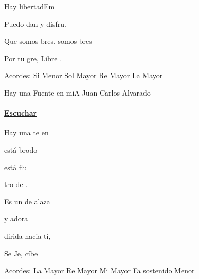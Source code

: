 \documentclass[12pt, spanish]{book}
\begin{document}
\begin{song}{Hay libertad}{Em}
\begin{SBExtraKeys}
{\begin{SBChorus}
                Puedo dan y disfru.
            \end{SBChorus}

            \begin{SBChorus}
                Que somos bres, somos bres

                Por tu gre, Libre .
            \end{SBChorus}


            \ifChordBk
            \begin{SBOpGroup}
                Acordes:\break
                \upchord{\Bm}\qquad Si Menor \hfill
                \upchord{\G}\qquad Sol Mayor \hfill\null\break
                \upchord{\D}\qquad Re Mayor \hfill
                \upchord{\A}\qquad La Mayor \hfill\null\break
            \end{SBOpGroup}
            \fi
        }\end{SBExtraKeys}
    \end{song}

    \begin{song}{Hay una Fuente en mi}{A}
    {} %
    {Juan Carlos Alvarado}
    {} %
    {}
        \ifChordBk
        \paragraph{\mbox{}\hfill\protect\href{https://open.spotify.com/intl-es/track/5QcC5tFnqsNOjxksGXZHCB}{Escuchar}\mbox{}\hfill}
        \fi

        \begin{SBChorus}
            Hay una te en 

             está brodo

             está flu~

            tro de .
        \end{SBChorus}

        \begin{SBOpGroup}
            Es un  de alaza

            y  adora

            dirida hacia tí,

            Se Je, cíbe
        \end{SBOpGroup}

        \ifChordBk
        \begin{SBOpGroup}
            Acordes:
            \upchord{\A}\qquad La Mayor \hfill
            \upchord{\D}\qquad Re Mayor \hfill\null\break
            \upchord{\E}\qquad Mi Mayor \hfill
            \upchord{\Fsm}\qquad Fa sostenido Menor \hfill\null\break
        \end{SBOpGroup}
        \fi
    \end{song}
\end{document}
